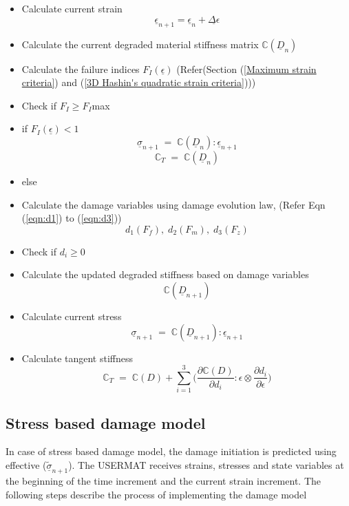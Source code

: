 \documentclass[a4paper,12pt,twoside]{report}
\begin{document}
\begin{itemize}
\item Calculate current strain \textbf{$$ \underline{\epsilon}_{n+1} = \underline{\epsilon}_{n} + \underline{\Delta \epsilon} $$}
\item Calculate the current degraded material stiffness matrix  \textbf{$\mathbb{C}(\underline{D}_{n})$}
\item Calculate the failure indices \textbf{$F_{I}(\underline{\epsilon})$} \;\; (Refer(Section (\ref{Maximum strain criteria}) and (\ref{3D Hashin's quadratic strain criteria})))
\item[] Check if $F_{I} \geq F_{I}$max
\item if \textbf{$F_{I}(\underline{\epsilon})<1$} \textbf{$$\underline{\sigma}_{n+1} \; = \; \mathbb{C}(\underline{D}_{n}) :  \underline{\epsilon}_{n+1} $$} \textbf{$$\mathbb{C}_{T} \; = \; \mathbb{C}(\underline{D}_{n})$$}
\item else
   	
\item[]  Calculate the damage variables using damage evolution law, \;\; (Refer Eqn (\ref{eqn:d1}) to (\ref{eqn:d3})) \textbf{$$d_{1}(F_{f}),\;d_{2}(F_{m}),\;d_{3}(F_{z})$$}
\item[]  Check if $d_{i} \geq 0 $ 
\item[]  Calculate the updated degraded stiffness based on damage variables \textbf{$$\mathbb{C}(\underline{D}_{n+1})$$}
\item[]  Calculate current stress  \textbf{$$\underline{\sigma}_{n+1} \; = \; \mathbb{C}(\underline{D}_{n+1}) :  \underline{\epsilon}_{n+1} $$}
\item[] Calculate tangent stiffness \textbf{$$\mathbb{C}_{T}  \; = \;\mathbb{C}(D) + \sum_{i = 1}^{3} \Big( \frac{\partial \mathbb{C}(D) }{\partial d_{i}} : \epsilon \otimes \frac{\partial d_{i}}{\partial \epsilon }\Big)$$}
	
\end{itemize} 


\subsection{Stress based damage model}
\indent\indent\indent  In case of stress based damage model, the damage initiation is predicted using effective ($\underline{\tilde{\sigma}}_{n+1}$).  The USERMAT receives strains, stresses and state variables at the beginning of the time increment and the current strain increment. The following steps describe the process of implementing the damage model
\end{document}
